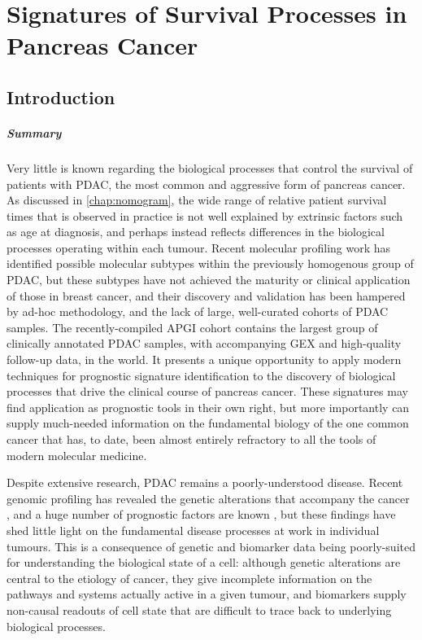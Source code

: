 \documentclass[dissertation.tex]{subfiles}
\begin{document}
\chapter{Signatures of Survival Processes in Pancreas Cancer}
\label{chap:signatures}


\section{Introduction}

\paragraph{Summary}Very little is known regarding the biological processes that control the survival of patients with \gls{PDAC}, the most common and aggressive form of pancreas cancer.  As discussed in \cref{chap:nomogram}, the wide range of relative patient survival times that is observed in practice is not well explained by extrinsic factors such as age at diagnosis, and perhaps instead reflects differences in the biological processes operating within each tumour.  Recent molecular profiling work has identified possible molecular subtypes within the previously homogenous group of \gls{PDAC}, but these subtypes have not achieved the maturity or clinical application of those in breast cancer, and their discovery and validation has been hampered by ad-hoc methodology, and the lack of large, well-curated cohorts of \gls{PDAC} samples.  The recently-compiled \gls{APGI} cohort contains the largest group of clinically annotated \gls{PDAC} samples, with accompanying \gls{GEX} and high-quality follow-up data, in the world.  It presents a unique opportunity to apply modern techniques for prognostic signature identification to the discovery of biological processes that drive the clinical course of pancreas cancer.  These signatures may find application as prognostic tools in their own right, but more importantly can supply much-needed information on the fundamental biology of the one common cancer that has, to date, been almost entirely refractory to all the tools of modern molecular medicine.

\vspace{1cm}

Despite extensive research, \gls{PDAC} remains a poorly-understood disease.  Recent genomic profiling has revealed the genetic alterations that accompany the cancer \cite{Biankin2012}, and a huge number of prognostic factors are known \cite{Harsha2009}, but these findings have shed little light on the fundamental disease processes at work in individual tumours.  This is a consequence of genetic and biomarker data being poorly-suited for understanding the biological state of a cell: although genetic alterations are central to the etiology of cancer, they give incomplete information on the pathways and systems actually active in a given tumour, and biomarkers supply non-causal readouts of cell state that are difficult to trace back to underlying biological processes.
\end{document}
